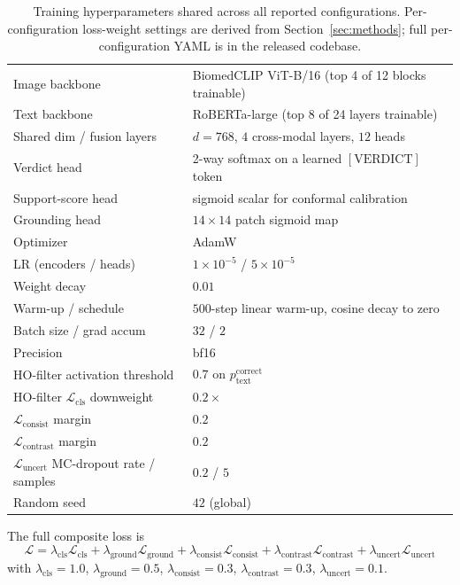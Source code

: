 \documentclass{article}
\begin{document}
\begin{table}[t]
\centering
\small
\caption{Training hyperparameters shared across all reported
configurations. Per-configuration loss-weight settings are derived from
Section~\ref{sec:methods}; full per-configuration YAML is in the
released codebase.}
\begin{tabular}{ll}
\toprule
Image backbone & BiomedCLIP ViT-B/16 (top 4 of 12 blocks trainable) \\
Text backbone & RoBERTa-large (top 8 of 24 layers trainable) \\
Shared dim / fusion layers & $d = 768$, $4$ cross-modal layers, $12$ heads \\
Verdict head & 2-way softmax on a learned $[\mathrm{VERDICT}]$ token \\
Support-score head & sigmoid scalar for conformal calibration \\
Grounding head & $14 \times 14$ patch sigmoid map \\
Optimizer & AdamW \\
LR (encoders / heads) & $1\times 10^{-5}$ / $5\times 10^{-5}$ \\
Weight decay & $0.01$ \\
Warm-up / schedule & $500$-step linear warm-up, cosine decay to zero \\
Batch size / grad accum & $32$ / $2$ \\
Precision & bf16 \\
HO-filter activation threshold & $0.7$ on $p_{\text{text}}^{\text{correct}}$ \\
HO-filter $\mathcal{L}_{\mathrm{cls}}$ downweight & $0.2\times$ \\
$\mathcal{L}_{\mathrm{consist}}$ margin & $0.2$ \\
$\mathcal{L}_{\mathrm{contrast}}$ margin & $0.2$ \\
$\mathcal{L}_{\mathrm{uncert}}$ MC-dropout rate / samples & $0.2$ / $5$ \\
Random seed & $42$ (global) \\
\bottomrule
\end{tabular}
\end{table}

The full composite loss is
\begin{equation*}
\mathcal{L} = \lambda_{\mathrm{cls}}\mathcal{L}_{\mathrm{cls}}
              + \lambda_{\mathrm{ground}}\mathcal{L}_{\mathrm{ground}}
              + \lambda_{\mathrm{consist}}\mathcal{L}_{\mathrm{consist}}
              + \lambda_{\mathrm{contrast}}\mathcal{L}_{\mathrm{contrast}}
              + \lambda_{\mathrm{uncert}}\mathcal{L}_{\mathrm{uncert}}
\end{equation*}
with $\lambda_{\mathrm{cls}} = 1.0$, $\lambda_{\mathrm{ground}} = 0.5$,
$\lambda_{\mathrm{consist}} = 0.3$, $\lambda_{\mathrm{contrast}} = 0.3$,
$\lambda_{\mathrm{uncert}} = 0.1$.
\end{document}
